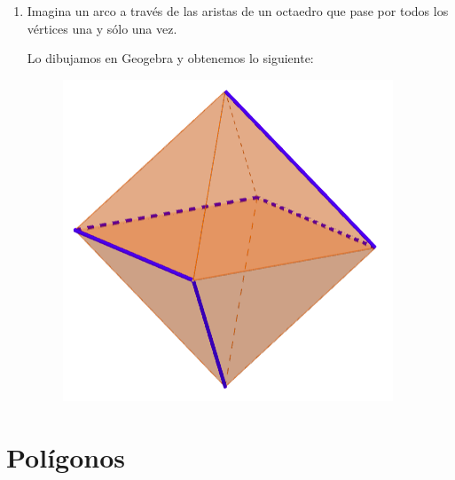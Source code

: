 \begin{enumerate}
	\item Imagina un arco a través de las aristas de un octaedro que pase por todos los vértices una y sólo una vez.
	
	Lo dibujamos en Geogebra y obtenemos lo siguiente:
	
	\begin{figure}[H]
		\centering
		\includegraphics[scale=0.35]{images/grafos_poligonos_poliedros/arco_tetraedro.png}
	\end{figure}
	
\end{enumerate}

\section{Polígonos}

